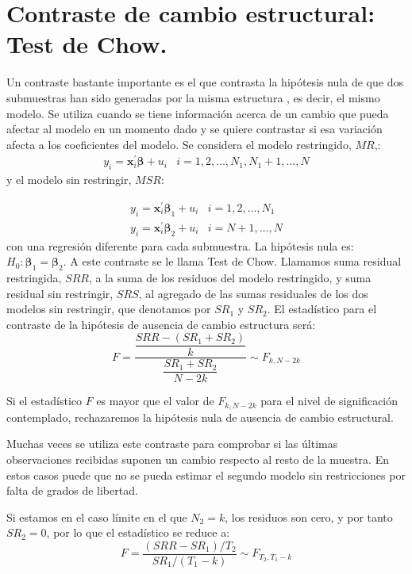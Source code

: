 \section{Contraste de cambio estructural: Test de Chow.}

Un contraste bastante importante es el que contrasta la hip\'otesis
nula de que dos submuestras han sido generadas por la misma estructura
, es decir, el mismo modelo. Se utiliza cuando se tiene informaci\'on
acerca de un cambio que pueda afectar al modelo en un momento dado
y se quiere contrastar si esa variaci\'on afecta a los coeficientes
del modelo. Se considera el modelo restringido, $MR$,: 
\[
\begin{array}{cc}
y_{i}=\boldsymbol{x}^{\prime}_{i}\boldsymbol{\beta}+u_{i} & i=1,2,\ldots,N_{1},N_{1}+1,\ldots,N\end{array}
\]
 y el modelo sin restringir, $MSR$:

\[
\begin{array}{cc}
y_{i}=\boldsymbol{x}^{\prime}_{i}\boldsymbol{\beta}_{1}+u_{i} & i=1,2,\ldots,N_{1}\\
y_{i}=\boldsymbol{x}^{\prime}_{i}\boldsymbol{\beta}_{2}+u_{i} & i=N+1,\ldots,N
\end{array}
\]
 con una regresi\'on diferente para cada submuestra. La hip\'otesis nula
es: $H_{0}:\boldsymbol{\beta}_{1}=\boldsymbol{\beta}_{2}$. A este
contraste se le llama Test de Chow. Llamamos suma residual restringida,
$SRR$, a la suma de los residuos del modelo restringido, y suma residual
sin restringir, $SRS$, al agregado de las sumas residuales de los
dos modelos sin restringir, que denotamos por $SR_{1}$ y $SR_{2}$.
El estad\'istico para el contraste de la hip\'otesis de ausencia de cambio
estructura ser\'a:
\[
F=\dfrac{\dfrac{SRR-\left(SR_{1}+SR_{2}\right)}{k}}{\dfrac{SR_{1}+SR_{2}}{N-2k}}\sim F_{k,N-2k}
\]


Si el estad\'istico $F$ es mayor que el valor de $F_{k,N-2k}$ para
el nivel de significaci\'on contemplado, rechazaremos la hip\'otesis nula
de ausencia de cambio estructural.

Muchas veces se utiliza este contraste para comprobar si las \'ultimas
observaciones recibidas suponen un cambio respecto al resto de la
muestra. En estos casos puede que no se pueda estimar el segundo modelo
sin restricciones por falta de grados de libertad.

Si estamos en el caso l\'imite en el que $N_{2}=k$, los residuos son
cero, y por tanto $SR_{2}=0$, por lo que el estad\'istico se reduce
a:
\[
F=\dfrac{\left(SRR-SR_{1}\right)/T_{2}}{SR_{1}/\left(T_{1}-k\right)}\sim F_{T_{2},T_{1}-k}
\]


